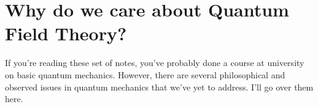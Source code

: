 \section{Why do we care about Quantum Field Theory? } 

If you're reading these set of notes, you've probably done a course at university on basic quantum mechanics. However, there are several philosophical and observed issues in quantum mechanics that we've yet to address. I'll go over them here. 


